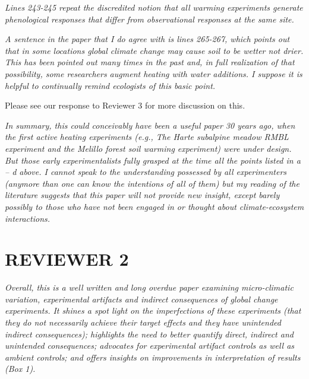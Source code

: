 \documentclass[11pt,a4paper]{letter}
\begin{document}
\emph {Lines 243-245 repeat the discredited notion that all warming experiments generate phenological responses that differ from observational responses at the same site. } 

\emph{A sentence in the paper that I do agree with is lines 265-267, which points out that in some locations global climate change may cause soil to be wetter not drier.  This has been pointed out many times in the past and, in full realization of that possibility, some researchers augment heating with water additions.  I suppose it is helpful to continually remind ecologists of this basic point.}
\par Please see our response to Reviewer 3 for more discussion on this.

\emph{In summary, this could conceivably have been a useful paper 30 years ago, when the first active heating experiments (e.g., The Harte subalpine meadow RMBL experiment and the Melillo forest soil warming experiment) were under design.  But those early experimentalists fully grasped at the time all the points listed in a -- d above.  I cannot speak to the understanding possessed by all experimenters (anymore than one can know the intentions of all of them) but my reading of the literature suggests that this paper will not provide new insight, except barely possibly to those who have not been engaged in or thought about climate-ecosystem interactions.} 


\section {REVIEWER 2}
\emph{Overall, this is a well written and long overdue paper examining micro-climatic variation, experimental artifacts and indirect consequences of global change experiments.  It shines a spot light on the imperfections of these experiments (that they do not necessarily achieve their target effects and they have unintended indirect consequences); highlights the need to better quantify direct, indirect and unintended consequences; advocates for experimental artifact controls as well as ambient controls;  and offers insights on improvements in interpretation of results (Box 1).}
\end{document}
